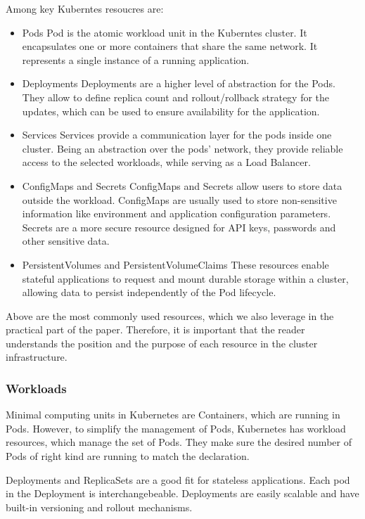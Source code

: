 Among key Kuberntes resoucres are:
\begin{itemize}
    \item Pods
        Pod is the atomic workload unit in the Kuberntes cluster. It encapsulates one or more containers that share the same network. It represents a single instance of a running application.
    \item Deployments
        Deployments are a higher level of abstraction for the Pods. They allow to define replica count and rollout/rollback strategy for the updates, which can be used to ensure availability for the application.
    \item Services
        Services provide a communication layer for the pods inside one cluster. Being an abstraction over the pods' network, they provide reliable access to the selected workloads, while serving as a Load Balancer. 
    \item ConfigMaps and Secrets
        ConfigMaps and Secrets allow users to store data outside the workload. ConfigMaps are usually used to store non-sensitive information like environment and application configuration parameters. Secrets are a more secure resource designed for API keys, passwords and other sensitive data.
    \item PersistentVolumes and PersistentVolumeClaims
        These resources enable stateful applications to request and mount durable storage within a cluster, allowing data to persist independently of the Pod lifecycle.
\end{itemize}

Above are the most commonly used resources, which we also leverage in the practical part of the paper. Therefore, it is important that the reader understands the position and the purpose of each resource in the cluster infrastructure.

\subsubsection*{Workloads}

Minimal computing units in Kubernetes are Containers, which are running in Pods. However, to simplify the management of Pods, Kubernetes has workload resources, which manage the set of Pods. They make sure the desired number of Pods of right kind are running to match the declaration.

Deployments and ReplicaSets are a good fit for stateless applications. Each pod in the Deployment is interchangebeable. Deployments are easily scalable and have built-in versioning and rollout mechanisms.

